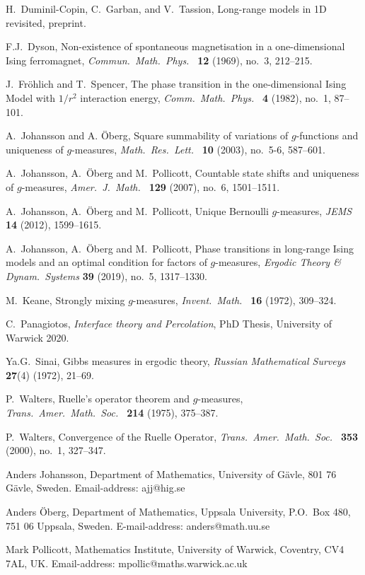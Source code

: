 \documentclass[11pt, a4paper]{amsart}
\theoremstyle{definition}
\theoremstyle{remark}
\begin{document}
\begin{thebibliography}{999}
H.\ Duminil-Copin, C.\ Garban, and V.\ Tassion, Long-range models in 1D revisited, preprint.

 F.J.\ Dyson, Non-existence of spontaneous
  magnetisation in a one-dimensional Ising ferromagnet, {\em Commun.\
    Math.\ Phys.\ } {\bf 12} (1969), no.\ 3, 212--215.  

 
 J.\ Fr\"ohlich and T.\ Spencer, The phase transition in
  the one-dimensional Ising Model with $1/r^2$ interaction energy,
  {\em Comm.\ Math.\ Phys.\ } {\bf 4} (1982), no.\ 1, 87--101.

 A.\ Johansson and A. \"Oberg, Square summability of
  variations of $g$-functions and uniqueness of $g$-measures, {\em
    Math.\ Res.\ Lett.\ } {\bf 10} (2003), no.\ 5-6, 587--601.
    
 A.\ Johansson, A.\ \"Oberg and M.\ Pollicott,
  Countable state shifts and uniqueness of $g$-measures, {\em Amer.\
    J.\ Math.\ } {\bf 129} (2007), no.\ 6, 1501--1511.

 A.\ Johansson, A.\ \"Oberg and M.\ Pollicott, 
Unique Bernoulli $g$-measures, {\em JEMS} {\bf 14} (2012), 1599--1615.

\bibitem{johob4} A.\ Johansson, A.\ \"Oberg and M.\ Pollicott, 
Phase transitions in long-range Ising models and an optimal 
condition for factors of $g$-measures, {\em Ergodic Theory \& Dynam.\ Systems}
{\bf 39} (2019), no.\ 5, 1317--1330.

  
 M.\ Keane, Strongly mixing $g$-measures, {\em Invent.\
    Math.\ } {\bf 16} (1972), 309--324.
    
\bibitem{pan} 
C.\ Panagiotos, {\em Interface theory and Percolation}, PhD Thesis, University of Warwick 2020.    

\bibitem{sin}
Ya.G.\ Sinai, Gibbs measures in ergodic theory, {\em Russian Mathematical Surveys} {\bf 27}(4) (1972), 21--69. 

P.\ Walters, Ruelle's operator theorem and $g$-measures, {\em Trans.\ Amer.\ Math.\ Soc.\ } {\bf 214} (1975), 375--387.

\bibitem{walters3}
P.\ Walters, Convergence of the Ruelle Operator, {\em Trans.\ Amer.\ Math.\ Soc.\ } {\bf 353} (2000), 
no.\ 1, 327--347.
\end{thebibliography}


\noindent
Anders Johansson, Department of Mathematics, University of G\"avle,
801 76 G\"avle, Sweden. Email-address: ajj@hig.se\newline

\noindent
Anders \"Oberg, Department of Mathematics, Uppsala University, P.O.\
Box 480, 751 06 Uppsala, Sweden. E-mail-address:
anders@math.uu.se\newline

\noindent
Mark Pollicott, Mathematics Institute, University of Warwick,
Coventry, CV4 7AL, UK. Email-address: mpollic@maths.warwick.ac.uk
\end{document}
